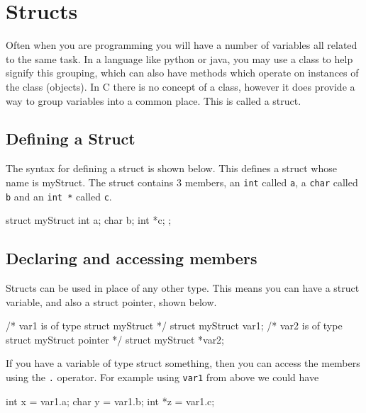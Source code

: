 
\chapter{Structs}



Often when you are programming you will have a number of variables all related to the same task.
In a language like python or java, you may use a class to help signify this grouping, which can also have methods which operate on instances of the class (objects).
In C there is no concept of a class, however it does provide a way to group variables into a common place.
This is called a struct.

\section{Defining a Struct}

The syntax for defining a struct is shown below.
This defines a struct whose name is myStruct.
The struct contains 3 members, an \texttt{int} called \texttt{a}, a \texttt{char} called \texttt{b} and an \texttt{int *} called \texttt{c}.

\begin{codeblock}
struct myStruct {
    int a;
    char b;
    int *c;
};
\end{codeblock}

\section{Declaring and accessing members}

Structs can be used in place of any other type.
This means you can have a struct variable, and also a struct pointer, shown below.

\begin{codeblock}
/* var1 is of type struct myStruct */
struct myStruct var1; 
/* var2 is of type struct myStruct pointer */
struct myStruct *var2; 
\end{codeblock}

If you have a variable of type struct something, then you can access the members using the \texttt{.} operator.
For example using \texttt{var1} from above we could have

\begin{codeblock}
int x = var1.a;
char y = var1.b;
int *z = var1.c;
\end{codeblock}

